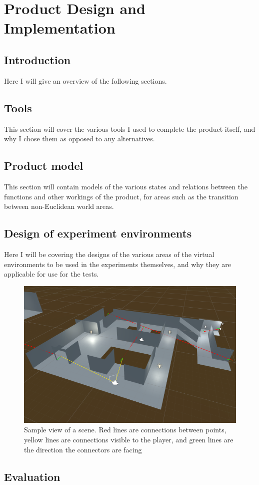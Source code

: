 \chapter[Product]{Product Design and Implementation}
\label{design}

	\section{Introduction}
		Here I will give an overview of the following sections.

	\section{Tools}
		This section will cover the various tools I used to complete the product itself, and why I chose them as opposed to any alternatives.

	\section{Product model}
		This section will contain models of the various states and relations between the functions and other workings of the product, for areas such as the transition between non-Euclidean world areas.

	\section{Design of experiment environments}
		Here I will be covering the designs of the various areas of the virtual environments to be used in the experiments themselves, and why they are applicable for use for the tests.

		\begin{figure}
			\label{design:fig:scene}
			\includegraphics[width=1\textwidth]{Images/Lines_Everywhere2}
			\centering
			\caption{Sample view of a scene.
				Red lines are connections between points,
				yellow lines are connections visible to the player,
				and green lines are the direction the connectors are facing}
		\end{figure}

	\section{Evaluation}


